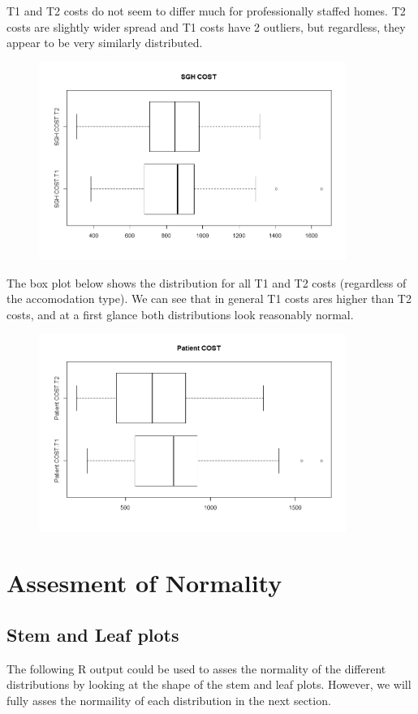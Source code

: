 \documentclass[]{article}
\begin{document}
T1 and T2 costs do not seem to differ much for professionally staffed homes. T2 costs are slightly wider spread and T1 costs have 2 outliers, but regardless, they appear to be very similarly distributed.
\begin{figure}[H]
\centering
\includegraphics[width=10cm]{RStudio/jpeg/Box_SGH.jpeg}
\end{figure}
The box plot below shows the distribution for all T1 and T2 costs (regardless of the accomodation type). We can see that in general T1 costs ares higher than T2 costs, and at a first glance both distributions look reasonably normal.
\begin{figure}[H]
\centering
\includegraphics[width=10cm]{RStudio/jpeg/Box_COST.jpeg}
\end{figure}

\section{Assesment of Normality}
\subsection{Stem and Leaf plots}
The following R output could be used to asses the normality of the different distributions by looking at the shape of the stem and leaf plots. However, we will fully asses the normaility of each distribution in the next section.
\end{document}
